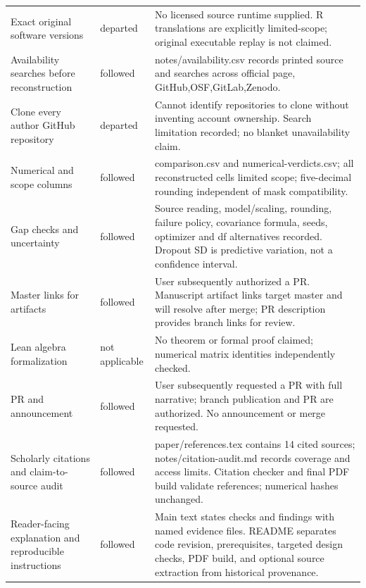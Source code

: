 \documentclass[11pt]{article}
\begin{document}
\begin{longtable}{p{.29\linewidth}p{.12\linewidth}p{.51\linewidth}}
Exact original software versions&departed&No licensed source runtime supplied. R translations are explicitly limited-scope; original executable replay is not claimed.\\
Availability searches before reconstruction&followed&notes/availability.csv records printed source and searches across official page, GitHub,OSF,GitLab,Zenodo.\\
Clone every author GitHub repository&departed&Cannot identify repositories to clone without inventing account ownership. Search limitation recorded; no blanket unavailability claim.\\
Numerical and scope columns&followed&comparison.csv and numerical-verdicts.csv; all reconstructed cells limited scope; five-decimal rounding independent of mask compatibility.\\
Gap checks and uncertainty&followed&Source reading, model/scaling, rounding, failure policy, covariance formula, seeds, optimizer and df alternatives recorded. Dropout SD is predictive variation, not a confidence interval.\\
Master links for artifacts&followed&User subsequently authorized a PR. Manuscript artifact links target master and will resolve after merge; PR description provides branch links for review.\\
Lean algebra formalization&not applicable&No theorem or formal proof claimed; numerical matrix identities independently checked.\\
PR and announcement&followed&User subsequently requested a PR with full narrative; branch publication and PR are authorized. No announcement or merge requested.\\
Scholarly citations and claim-to-source audit&followed&paper/references.tex contains 14 cited sources; notes/citation-audit.md records coverage and access limits. Citation checker and final PDF build validate references; numerical hashes unchanged.\\
Reader-facing explanation and reproducible instructions&followed&Main text states checks and findings with named evidence files. README separates code revision, prerequisites, targeted design checks, PDF build, and optional source extraction from historical provenance.\\
\bottomrule\end{longtable}\normalsize
\end{document}
